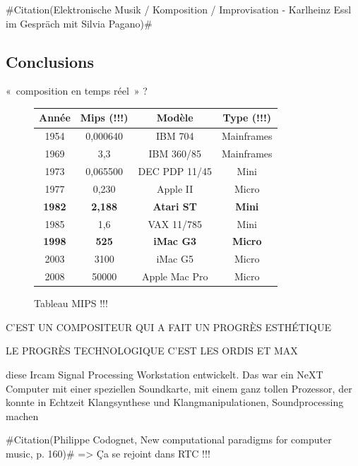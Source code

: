 \documentclass[a4paper,12pt]{article}
\newcommand{\guill}[1]{«~#1~»}
\newcommand{\zitat}[2]{\#Citation(#2)\#}
\begin{document}
\zitat{Ein Computer wird nie müde. Mit dem Computer kann man eine Musik in Szene setzen, die nie aufhört, das geht mit Musikern natürlich nicht.}
{Elektronische Musik / Komposition / Improvisation - Karlheinz Essl im Gespräch mit Silvia Pagano}



\subsection{Conclusions}

 \guill{composition en temps réel} ?

\begin{figure}
\begin{center}
\begin{tabular}{|c|c|c|c|}
\hline
\textbf{Année} & \textbf{Mips} (!!!) & \textbf{Modèle} & \textbf{Type} (!!!) \\
\hline
1954 & 0,000640 & IBM 704 & Mainframes \\
\hline
1969 & 3,3 & IBM 360/85 & Mainframes \\
\hline
1973 & 0,065500 & DEC PDP 11/45 & Mini \\
\hline
1977 & 0,230 & Apple II & Micro \\
\hline
\textbf{1982} & \textbf{2,188} & \textbf{Atari ST} & \textbf{Mini} \\
\hline
1985 & 1,6 & VAX 11/785 & Mini \\
\hline
\textbf{1998} & \textbf{525} & \textbf{iMac G3} & \textbf{Micro} \\
\hline
2003 & 3100 & iMac G5 & Micro \\
\hline
2008 & 50000 & Apple Mac Pro & Micro \\
\hline
\end{tabular}
\end{center}
\caption{Tableau MIPS !!!}
\label{tableaumips}
\end{figure}

C'EST UN COMPOSITEUR QUI A FAIT UN PROGRÈS ESTHÉTIQUE

LE PROGRÈS TECHNOLOGIQUE C'EST LES ORDIS ET MAX

diese Ircam Signal Processing Workstation entwickelt. Das war ein NeXT Computer mit einer speziellen Soundkarte, mit einem ganz tollen Prozessor, der konnte in Echtzeit Klangsynthese und Klangmanipulationen, Soundprocessing machen

\zitat{It is interesting to note that we have with Cage two ways of using randomness for music composition. One, inhreited from Duchamp, is what can be called \emph{internal chance}: randomness is used at composition time to determine the score, which is then written and closed. The other can be called \emph{external chance}: the score is open to real-time chance operation and external perturbation. In that respect, \emph{4'33''} is certainly the best and minimal example of external chance.}
{Philippe Codognet, New computational paradigms for computer music, p. 160}
=> Ça se rejoint dans RTC !!!
\end{document}
